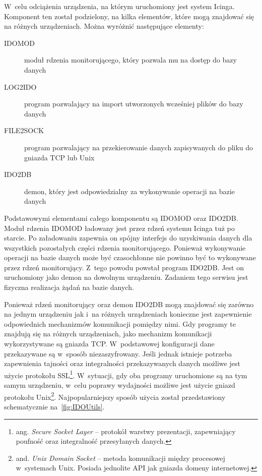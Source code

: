W~celu odciążenia urządzenia, na którym uruchomiony jest system
Icinga. Komponent ten został podzielony, na kilka elementów, które
mogą znajdować się na różnych urządzeniach. Można wyróżnić następujące
elementy:

\begin{description}
\item[IDOMOD] moduł rdzenia monitorującego, który pozwala mu na dostęp
  do bazy danych
\item[LOG2IDO] program pozwalający na import utworzonych wcześniej
  plików do bazy danych
\item[FILE2SOCK] program pozwalający na przekierowanie danych
  zapisywanych do pliku do gniazda TCP lub Unix
\item[IDO2DB] demon, który jest odpowiedzialny za wykonywanie operacji
  na bazie danych
\end{description}

Podstawowymi elementami całego komponentu są IDOMOD oraz IDO2DB. Moduł
rdzenia IDOMOD ładowany jest przez rdzeń systemu Icinga tuż po
starcie. Po załadowaniu zapewnia on spójny interfejs do uzyskiwania
danych dla wszystkich pozostałych części rdzenia
monitorującego. Ponieważ wykonywanie operacji na bazie danych może być
czasochłonne nie powinno być to wykonywane przez rdzeń
monitorujący. Z~tego powodu powstał program IDO2DB. Jest on
uruchomiony jako demon na dowolnym urządzeniu. Zadaniem tego serwisu
jest fizyczna realizacja żądań na bazie danych.

Ponieważ rdzeń monitorujący oraz demon IDO2DB mogą znajdować się
zarówno na jednym urządzeniu jak i~na różnych urządzeniach konieczne
jest zapewnienie odpowiednich mechanizmów komunikacji pomiędzy nimi.
Gdy programy te znajdują się na różnych urządzeniach, jako mechanizm
komunikacji wykorzystywane są gniazda TCP. W~podstawowej konfiguracji
dane przekazywane są w~sposób niezaszyfrowany. Jeśli jednak istnieje
potrzeba zapewnienia tajności oraz integralności przekazywanych danych
możliwe jest użycie protokołu SSL\footnote{ ang. {\em Secure Socket
    Layer} -- protokół warstwy prezentacji, zapewniający poufność oraz
  integralność przesyłanych danych.}. W~sytuacji, gdy oba programy
uruchomione są na tym samym urządzeniu, w~celu poprawy wydajności
możliwe jest użycie gniazd protokołu Unix\footnote{ and. {\em Unix
    Domain Socket} -- metoda komunikacji między procesowej w~systemach
  Unix. Posiada jednolite API jak gniazda domeny
  internetowej.}. Najpopularniejszy sposób użycia został przedstawiony
schematycznie na~\ref{fig:IDOUtils}.


